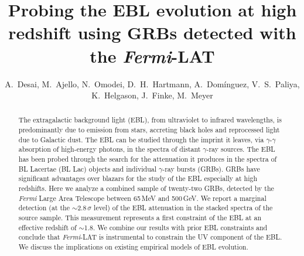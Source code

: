 \documentclass[12pt,preprint]{aastex}
\begin{document}
\title{Probing the EBL evolution at high redshift using GRBs detected with the {\it Fermi}-LAT}
\author{
A.~Desai,
M.~Ajello,
N.~Omodei,
D.~H.~Hartmann,
A.~Dom\'inguez,
V.~S.~Paliya,
K.~Helgason, 
J.~Finke,
M.~Meyer
}


\begin{abstract}

The extragalactic background light (EBL), from {ultraviolet to infrared wavelengths}, 
is {predominantly} due to emission from stars, accreting black holes and reprocessed light
due to Galactic dust.
The EBL can be
studied through the imprint it leaves, via  $\gamma$-$\gamma$
absorption of high-energy {photons}, in the spectra of distant
$\gamma$-ray sources. 
 {The EBL has been probed through the search for the attenuation it produces in the spectra of
BL Lacertae (BL Lac) objects and individual $\gamma$-ray bursts (GRBs).}
 {GRBs have significant advantages over blazars for the study of {the} EBL 
especially at high redshifts}.
Here we analyze a combined sample of
 {twenty-two} GRBs,
detected by the {\it Fermi} Large Area Telescope {between} 65\,MeV and
500\,GeV.
We report a marginal detection (at the $\sim$2.8\,$\sigma$ level) of
the EBL attenuation in the stacked spectra of the source sample.
This measurement represents a first {constraint} of the EBL at an
 effective redshift of $\sim$1.8. 
We combine our results with prior EBL constraints and conclude that {\it Fermi}-LAT is instrumental to constrain the UV component of the EBL. We discuss the implications on existing empirical models of EBL evolution. 


\end{abstract}
\end{document}
